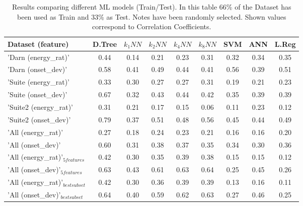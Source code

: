 \begin{table}
\centering

\footnotesize

\begin{tabular} {lcccccccc}
\\ \hline
Dataset (feature) & D.Tree& $k_1NN$ & $k_2NN$ & $k_4NN$ & $k_8NN$ & SVM & ANN & L.Reg \\ \hline
'Darn (energy\_rat)' & 0.44 & 0.14  & 0.21  & 0.23  & 0.31  & 0.32  & 0.34  & 0.35 \\
'Darn (onset\_dev)' & 0.58 & 0.41  & 0.49  & 0.44  & 0.41  & 0.56  & 0.39  & 0.51 \\
'Suite (energy\_rat)' & 0.33 & 0.30  & 0.27  & 0.27  & 0.31  & 0.19  & 0.21  & 0.23 \\
'Suite (onset\_dev)' & 0.67 & 0.32  & 0.43  & 0.44  & 0.42  & 0.35  & 0.39  & 0.39 \\
'Suite2 (energy\_rat)' & 0.31 & 0.21  & 0.17  & 0.15  & 0.06  & 0.11  & 0.23  & 0.12 \\
'Suite2 (onset\_dev)' & 0.79 & 0.37  & 0.51  & 0.48  & 0.56  & 0.45  & 0.44  & 0.49 \\ \hline
'All (energy\_rat)' & 0.27 & 0.18 & 0.24 & 0.23 & 0.21 & 0.16 & 0.16 & 0.20 \\
'All (onset\_dev)' & 0.60 & 0.31 & 0.38 & 0.37 & 0.35 & 0.34 & 0.30 & 0.36 \\
'All (energy\_rat)'$_{5 features}$ & 0.42 & 0.30 & 0.35 & 0.39 & 0.38 & 0.15 & 0.15 & 0.12 \\
'All (onset\_dev)'$_{5 features}$ & 0.63 & 0.43 & 0.61 & 0.63 & 0.64 & 0.25 & 0.45 & 0.26 \\
'All (energy\_rat)'$_{best subset}$ & 0.42 & 0.30 & 0.36 & 0.39 & 0.39 & 0.13 & 0.16 & 0.11 \\
'All (onset\_dev)'$_{best subset}$ & 0.64 & 0.40 & 0.59 & 0.62 & 0.63 & 0.27 & 0.46 & 0.25 \\

\hline
\end{tabular}


\footnotesize

\caption[Results comparing different ML models (Train/Test)]{Results comparing different ML models (Train/Test). In this table 66\% of the Dataset has been used as Train and 33\% as Test. Notes have been randomly selected. Shown values correspond to Correlation Coefficients.}
\label{tab:results_ml_tt}

\end{table}
